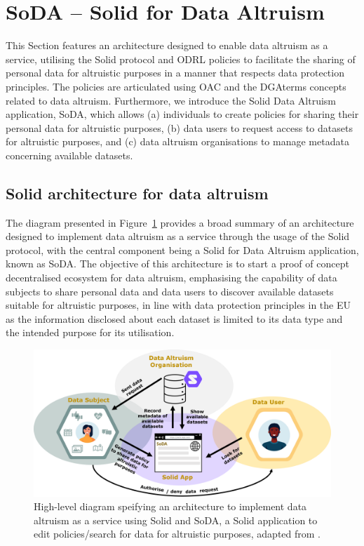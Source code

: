 \section{SoDA -- Solid for Data Altruism}
\label{sec:soda}

This Section features an architecture designed to enable data altruism as a service, utilising the Solid protocol and ODRL policies to facilitate the sharing of personal data for altruistic purposes in a manner that respects data protection principles.
The policies are articulated using OAC and the DGAterms concepts related to data altruism.
Furthermore, we introduce the Solid Data Altruism application, SoDA, which allows (a) individuals to create policies for sharing their personal data for altruistic purposes, (b) data users to request access to datasets for altruistic purposes, and (c) data altruism organisations to manage metadata concerning available datasets.

\subsection{Solid architecture for data altruism}
\label{sec:architecture_soda}

The diagram presented in Figure~\ref{fig:soda_architecture} provides a broad summary of an architecture designed to implement data altruism as a service through the usage of the Solid protocol, with the central component being a Solid for Data Altruism application, known as SoDA.
The objective of this architecture is to start a proof of concept decentralised ecosystem for data altruism, emphasising the capability of data subjects to share personal data and data users to discover available datasets suitable for altruistic purposes, in line with data protection principles in the EU as the information disclosed about each dataset is limited to its data type and the intended purpose for its utilisation.

\begin{figure}[ht]
  \centering
  \includegraphics[width=\linewidth]{figures/chapter-7/architecture.png}
  \caption{High-level diagram speifying an architecture to implement data altruism as a service using Solid and SoDA, a Solid application to edit policies/search for data for altruistic purposes, adapted from \cite{esteves_towards_2023}.}
  \label{fig:soda_architecture}
\end{figure}

